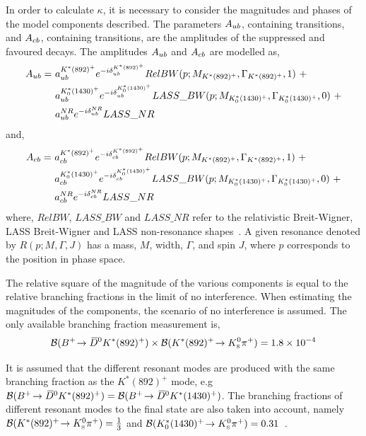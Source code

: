 In order to calculate $\kappa$, it is necessary to consider the magnitudes and phases of the model components described. The parameters $A_{{u}{b}}$, containing \decay{\bquark}{\uquark} transitions, and $A_{{c}{b}}$, containing \decay{\bquark}{\cquark} transitions, are the amplitudes of the suppressed and favoured  decays. The amplitudes $A_{{u}{b}}$ and $A_{{c}{b}}$ are modelled as,
\begin{align*}
A_{\uquark\bquark} =\ & a_{\uquark\bquark}^{K^*(892)^+}e^{-i\delta_{\uquark\bquark}^{K^*(892)^+}}RelBW(p;M_{K^*(892)^+},\Gamma_{K^*(892)^+},1)\ + \\
& a_{\uquark\bquark}^{K^*_0(1430)^+}e^{-i\delta_{\uquark\bquark}^{K^*_0(1430)^+}}LASS\_BW(p;M_{K^*_0(1430)^+},\Gamma_{K^*_0(1430)^+},0)\ + \\
& a_{\uquark\bquark}^{NR}e^{-i\delta_{\uquark\bquark}^{NR}}LASS\_NR
\end{align*}
and,
\begin{align*}
A_{\cquark\bquark} =\ & a_{\cquark\bquark}^{K^*(892)^+}e^{-i\delta_{\cquark\bquark}^{K^*(892)^+}}RelBW(p;M_{K^*(892)^+},\Gamma_{K^*(892)^+},1)\ + \\
& a_{\cquark\bquark}^{K^*_0(1430)^+}e^{-i\delta_{\cquark\bquark}^{K^*_0(1430)^+}}LASS\_BW(p;M_{K^*_0(1430)^+},\Gamma_{K^*_0(1430)^+},0)\ + \\
& a_{\cquark\bquark}^{NR}e^{-i\delta_{\cquark\bquark}^{NR}}LASS\_NR
\end{align*}
where, $RelBW$, $LASS\_BW$ and $LASS\_NR$ refer to the relativistic Breit-Wigner, LASS Breit-Wigner and LASS non-resonance shapes~\cite{LASS}. A given resonance denoted by $R(p;M,\Gamma,J)$ has a mass, $M$, width, $\Gamma$, and spin $J$, where $p$ corresponds to the position in \decay{\Bm}{\D\KS\pim} phase space.%

The relative square of the magnitude of the various components is equal to the relative branching fractions in the limit of no interference. When estimating the magnitudes of the components, the scenario of no interference is assumed. The only available branching fraction measurement is,
\begin{equation*}
{\ensuremath{\mathcal{B}}}({{{B}^+}}\!\rightarrow {\ensuremath{{\kern 0.2em\overline{\kern -0.2em D}{}}{}^0}} K^*(892)^+) \times {\ensuremath{\mathcal{B}}}(K^*(892)^+\!\rightarrow {\ensuremath{{K}^0_{\mathrm{ \scriptscriptstyle S}}}}{\ensuremath{{\pi}^+}}) = 1.8 \times 10^{-4}
\end{equation*}

It is assumed that the different resonant \Kstarp modes are produced with the same branching fraction as the $K^*(892)^+$ mode, e.g ${\mathcal{B}}({{{B}^+}}\!\rightarrow {\ensuremath{{\kern 0.2em\overline{\kern -0.2em D}{}}{}^0}} K^*(892)^+) = {\mathcal{B}}({{{B}^+}}\!\rightarrow {\ensuremath{{\kern 0.2em\overline{\kern -0.2em D}{}}{}^0}} K^*(1430)^+)$. The branching fractions of different resonant \Kstarp modes to the \KS\pip final state are also taken into account, namely ${\mathcal{B}}(K^*(892)^+\!\rightarrow {\ensuremath{{K}^0_{\mathrm{ \scriptscriptstyle S}}}}{\ensuremath{{\pi}^+}}) = \frac{1}{3}$ and ${\mathcal{B}}(K^*_0(1430)^+\!\rightarrow {\ensuremath{{K}^0_{\mathrm{ \scriptscriptstyle S}}}}{\ensuremath{{\pi}^+}}) = 0.31$~\cite{PDG2016}.

